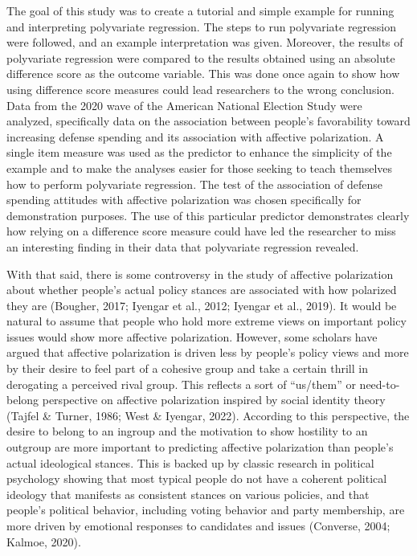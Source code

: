 \documentclass[authordate, meta]{jote-new-article}
\begin{document}
	The goal of this study was to create a tutorial and simple example for running and interpreting polyvariate regression. The steps to run polyvariate regression were followed, and an example interpretation was given. Moreover, the results of polyvariate regression were compared to the results obtained using an absolute difference score as the outcome variable. This was done once again to show how using difference score measures could lead researchers to the wrong conclusion. Data from the 2020 wave of the American National Election Study were analyzed, specifically data on the association between people's favorability toward increasing defense spending and its association with affective polarization. A single item measure was used as the predictor to enhance the simplicity of the example and to make the analyses easier for those seeking to teach themselves how to perform polyvariate regression. The test of the association of defense spending attitudes with affective polarization was chosen specifically for demonstration purposes. The use of this particular predictor demonstrates clearly how relying on a difference score measure could have led the researcher to miss an interesting finding in their data that polyvariate regression revealed.



	With that said, there is some controversy in the study of affective polarization about whether people's actual policy stances are associated with how polarized they are (Bougher, 2017; Iyengar et al., 2012; Iyengar et al., 2019). It would be natural to assume that people who hold more extreme views on important policy issues would show more affective polarization. However, some scholars have argued that affective polarization is driven less by people's policy views and more by their desire to feel part of a cohesive group and take a certain thrill in derogating a perceived rival group. This reflects a sort of “us/them” or need-to-belong perspective on affective polarization inspired by social identity theory (Tajfel \& Turner, 1986; West \& Iyengar, 2022). According to this perspective, the desire to belong to an ingroup and the motivation to show hostility to an outgroup are more important to predicting affective polarization than people's actual ideological stances. This is backed up by classic research in political psychology showing that most typical people do not have a coherent political ideology that manifests as consistent stances on various policies, and that people's political behavior, including voting behavior and party membership, are more driven by emotional responses to candidates and issues (Converse, 2004; Kalmoe, 2020).
\end{document}

